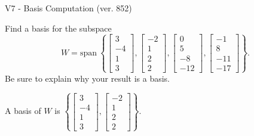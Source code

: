 \begin{exercise}
  \begin{exerciseTitle}V7 - Basis Computation (ver. 852)\end{exerciseTitle}
  \begin{exerciseStatement}
    Find a basis for the subspace 
\[W=\mathrm{span}\ \left\{\left[\begin{array}{r}
3 \\
-4 \\
1 \\
3
\end{array}\right] , \left[\begin{array}{r}
-2 \\
1 \\
2 \\
2
\end{array}\right] , \left[\begin{array}{r}
0 \\
5 \\
-8 \\
-12
\end{array}\right] , \left[\begin{array}{r}
-1 \\
8 \\
-11 \\
-17
\end{array}\right]\right\}.\]
 Be sure to explain why your result is a basis.


  \end{exerciseStatement}
  \begin{exerciseAnswer}
   A basis of \(W\) is  \(\left\{\left[\begin{array}{r}
3 \\
-4 \\
1 \\
3
\end{array}\right] , \left[\begin{array}{r}
-2 \\
1 \\
2 \\
2
\end{array}\right]\right\}\).
  


  \end{exerciseAnswer}
\end{exercise}